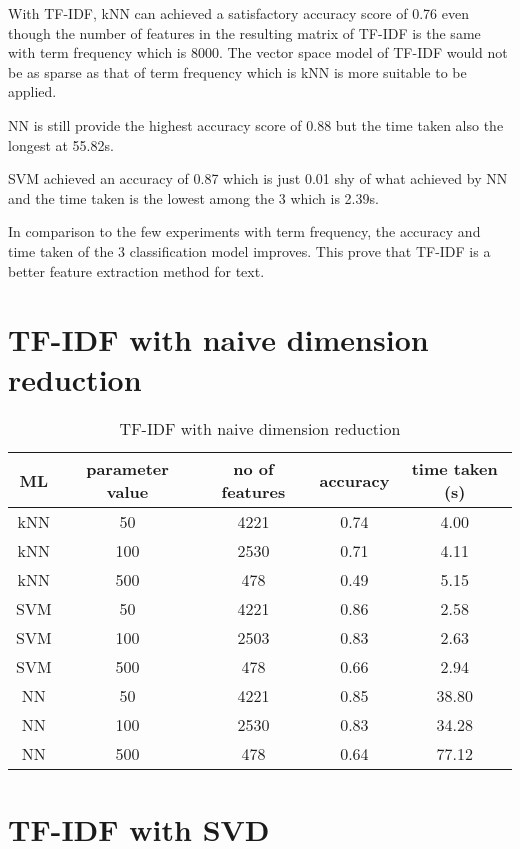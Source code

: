 With TF-IDF, kNN can achieved a satisfactory accuracy score of 0.76 even though the number of features in the resulting matrix of TF-IDF is the same with term frequency which is 8000. The vector space model of TF-IDF would not be as sparse as that of term frequency which is kNN is more suitable to be applied.

NN is still provide the highest accuracy score of 0.88 but the time taken also the longest at 55.82s.

SVM achieved an accuracy of 0.87 which is just 0.01 shy of what achieved by NN and the time taken is the lowest among the 3 which is 2.39s.

In comparison to the few experiments with term frequency, the accuracy and time taken of the 3 classification model improves. This prove that TF-IDF is a better feature extraction method for text.


\section{TF-IDF with naive dimension reduction}

\begin{table} [ht]
	\centering
	\begin{tabular}{|| c | c | c | c | c||}
		\hline
		ML & parameter value & no of features & accuracy & time taken (s) \\ [0.5ex]
		\hline\hline
		kNN & 50 & 4221 & 0.74 & 4.00 \\ 
		\hline
		kNN & 100 & 2530 & 0.71 & 4.11 \\ 
		\hline
		kNN & 500 & 478 & 0.49 & 5.15 \\ 
		\hline\hline
		SVM & 50 & 4221 & 0.86 & 2.58 \\
		\hline
		SVM & 100 & 2503 & 0.83 & 2.63 \\
		\hline
		SVM & 500 & 478 & 0.66 & 2.94 \\
		\hline\hline
		NN & 50 & 4221 & 0.85 & 38.80 \\
		\hline
		NN & 100 & 2530 & 0.83 & 34.28 \\
		\hline
		NN & 500 & 478 & 0.64 & 77.12 \\
		\hline\hline
	\end{tabular}
\caption{TF-IDF with naive dimension reduction}
\label{tbl:tfidfNaive}
\end{table}

\section{TF-IDF with SVD}

